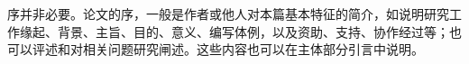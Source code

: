 \begin{Preclude}
序并非必要。论文的序，一般是作者或他人对本篇基本特征的简介，如说明研究工作缘起、背景、主旨、目的、意义、编写体例，以及资助、支持、协作经过等；也可以评述和对相关问题研究闸述。这些内容也可以在主体部分引言中说明。 
\end{Preclude}
